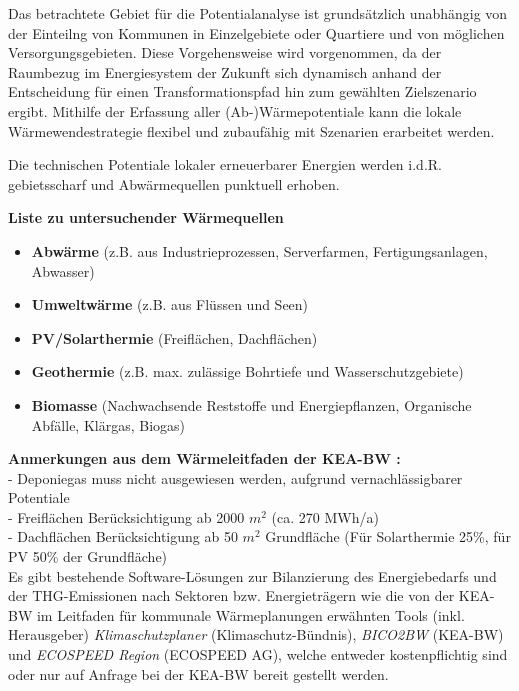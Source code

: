 				Das betrachtete Gebiet für die Potentialanalyse ist grundsätzlich unabhängig von der Einteilng von Kommunen in Einzelgebiete oder Quartiere und von möglichen Versorgungsgebieten. Diese Vorgehensweise wird vorgenommen, da der Raumbezug im Energiesystem der Zukunft sich dynamisch anhand der Entscheidung für einen Transformationspfad hin zum gewählten Zielszenario ergibt. Mithilfe der Erfassung aller (Ab-)Wärmepotentiale kann die lokale Wärmewendestrategie flexibel und zubaufähig mit Szenarien erarbeitet werden. \cite{kea_bw_leitfaden_waermeplanung}
				
				Die technischen Potentiale lokaler erneuerbarer Energien werden i.d.R. gebietsscharf und Abwärmequellen punktuell erhoben. 
				
				\textbf{Liste zu untersuchender Wärmequellen}
				\begin{itemize}
					\item{\textbf{Abwärme} (z.B. aus Industrieprozessen, Serverfarmen, Fertigungsanlagen, Abwasser)}
					\item{\textbf{Umweltwärme} (z.B. aus Flüssen und Seen)}
					\item{\textbf{PV/Solarthermie} (Freiflächen, Dachflächen)}
					\item{\textbf{Geothermie} (z.B. max. zulässige Bohrtiefe und Wasserschutzgebiete)}
					\item{\textbf{Biomasse} (Nachwachsende Reststoffe und Energiepflanzen, Organische Abfälle, Klärgas, Biogas)}
				\end{itemize}
				
				\textbf{Anmerkungen aus dem Wärmeleitfaden der KEA-BW \cite{kea_bw_leitfaden_waermeplanung}:}\\
				- Deponiegas muss nicht ausgewiesen werden, aufgrund vernachlässigbarer Potentiale\\
			 	- Freiflächen Berücksichtigung ab 2000 $m^2$ (ca. 270 MWh/a)\\
				- Dachflächen Berücksichtigung ab 50 $m^2$ Grundfläche (Für Solarthermie 25\%, für PV 50\% der Grundfläche)\\
			
				Es gibt bestehende Software-Lösungen zur Bilanzierung des Energiebedarfs und der THG-Emissionen nach Sektoren bzw. Energieträgern wie die von der KEA-BW im Leitfaden für kommunale Wärmeplanungen erwähnten Tools (inkl. Herausgeber) \textit{Klimaschutzplaner} (Klimaschutz-Bündnis), \textit{BICO2BW} (KEA-BW) und \textit{ECOSPEED Region} (ECOSPEED AG), welche entweder kostenpflichtig sind oder nur auf Anfrage bei der KEA-BW bereit gestellt werden. 
			
